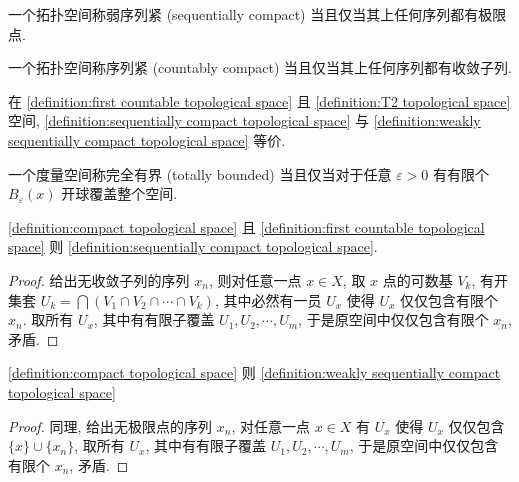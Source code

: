 \begin{definition}[弱序列紧]
    \label {definition:weakly sequentially compact topological space}
    一个拓扑空间称弱序列紧 (sequentially compact) 当且仅当其上任何序列都有极限点.
\end{definition}

\begin{definition}[序列紧]
    \label {definition:sequentially compact topological space}
    一个拓扑空间称序列紧 (countably compact) 当且仅当其上任何序列都有收敛子列.
\end{definition}

\begin{corollary}
    在 \ref{definition:first countable topological space} 且 \ref{definition:T2 topological space} 空间, 
    \ref{definition:sequentially compact topological space} 与 \ref{definition:weakly sequentially compact topological space} 等价.
\end{corollary}

\begin{definition}[完全有界]
    \label {definition:totally bounded topological space}
    一个度量空间称完全有界 (totally bounded) 当且仅当对于任意 \(\varepsilon > 0\) 有有限个 \(B_\varepsilon (x)\) 开球覆盖整个空间.
\end{definition}

\begin{lemma}
    \ref{definition:compact topological space} 且 \ref{definition:first countable topological space} 则 \ref{definition:sequentially compact topological space}.

    \begin{proof}
        给出无收敛子列的序列 \(x_n\), 则对任意一点 \(x \in X\), 取 \(x\) 点的可数基 \(V_k\), 有开集套 \(U_k = \bigcap (V_1 \cap V_2 \cap \cdots \cap V_k)\),
        其中必然有一员 \(U_x\) 使得 \(U_x\) 仅仅包含有限个 \(x_n\).
        取所有 \(U_x\), 其中有有限子覆盖 \(U_{1}, U_{2}, \cdots, U_{m}\), 于是原空间中仅仅包含有限个 \(x_n\), 矛盾.
    \end{proof}
\end{lemma}

\begin{lemma}
    \ref{definition:compact topological space} 则 \ref{definition:weakly sequentially compact topological space}

    \begin{proof}
        同理, 给出无极限点的序列 \(x_n\), 对任意一点 \(x \in X\) 有 \(U_x\) 使得 \(U_x\) 仅仅包含 \(\{x\} \cup \{x_n\}\),
        取所有 \(U_x\), 其中有有限子覆盖 \(U_{1}, U_{2}, \cdots, U_{m}\), 于是原空间中仅仅包含有限个 \(x_n\), 矛盾.
    \end{proof}
\end{lemma}


